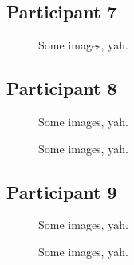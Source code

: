\subsection{Participant 7}

\begin{figure}[h]
	\caption{Some images, yah.}
\end{figure}


\clearpage

\subsection{Participant 8}

\begin{figure}[h]
	\caption{Some images, yah.}
\end{figure}

\clearpage

\begin{figure}[h]
	\caption{Some images, yah.}
\end{figure}


\clearpage

\subsection{Participant 9}

\begin{figure}[h]
	\caption{Some images, yah.}
\end{figure}

\clearpage

\begin{figure}[h]
	\caption{Some images, yah.}
\end{figure}


